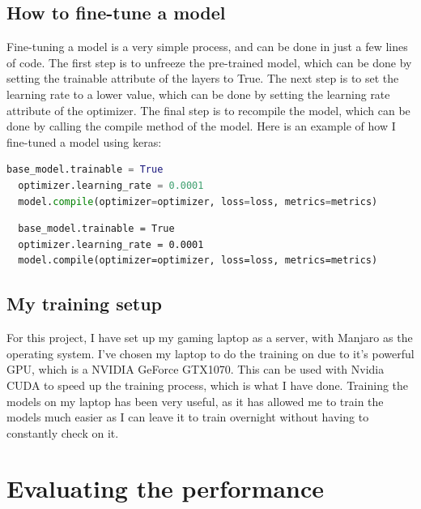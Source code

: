 \documentclass[]{final_report}
\begin{document}
\section{How to fine-tune a model}
Fine-tuning a model is a very simple process, and can be done in just a few lines of code.
The first step is to unfreeze the pre-trained model, which can be done by setting the trainable attribute of the layers to True.
The next step is to set the learning rate to a lower value, which can be done by setting the learning rate attribute of the optimizer.
The final step is to recompile the model, which can be done by calling the compile method of the model.
Here is an example of how I fine-tuned a model using keras:

\begin{lstlisting}[language=Python]
  base_model.trainable = True
  optimizer.learning_rate = 0.0001
  model.compile(optimizer=optimizer, loss=loss, metrics=metrics)
\end{lstlisting}

\begin{verbatim}
  base_model.trainable = True
  optimizer.learning_rate = 0.0001
  model.compile(optimizer=optimizer, loss=loss, metrics=metrics)
\end{verbatim}


\section{My training setup}
For this project, I have set up my gaming laptop as a server, with Manjaro\cite{Manjaro} as the operating system.
I've chosen my laptop to do the training on due to it's powerful GPU, which is a NVIDIA GeForce GTX1070\cite{GTX1070}.
This can be used with Nvidia CUDA\cite{CUDA} to speed up the training process, which is what I have done.
Training the models on my laptop has been very useful, as it has allowed me to train the models much easier 
as I can leave it to train overnight without having to constantly check on it.

\chapter{Evaluating the performance}
\end{document}
